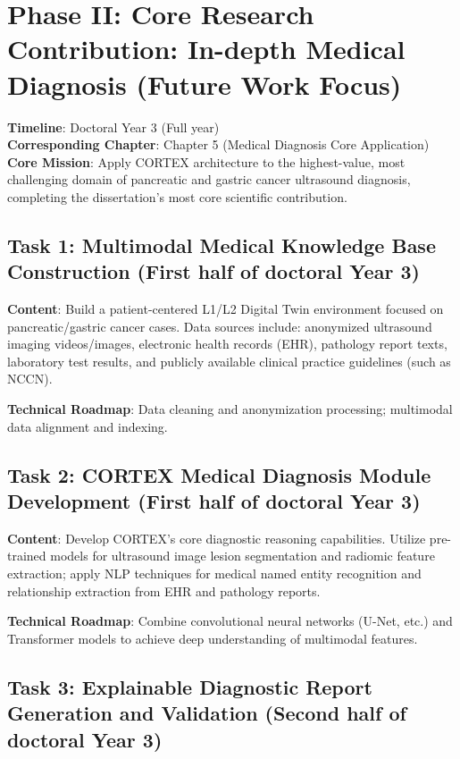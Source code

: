 \section{Phase II: Core Research Contribution: In-depth Medical Diagnosis (Future Work Focus)}

\textbf{Timeline}: Doctoral Year 3 (Full year)\\
\textbf{Corresponding Chapter}: Chapter 5 (Medical Diagnosis Core Application)\\
\textbf{Core Mission}: Apply CORTEX architecture to the highest-value, most challenging domain of pancreatic and gastric cancer ultrasound diagnosis, completing the dissertation's most core scientific contribution.

\subsection{Task 1: Multimodal Medical Knowledge Base Construction (First half of doctoral Year 3)}

\textbf{Content}: Build a patient-centered L1/L2 Digital Twin environment focused on pancreatic/gastric cancer cases. Data sources include: anonymized ultrasound imaging videos/images, electronic health records (EHR), pathology report texts, laboratory test results, and publicly available clinical practice guidelines (such as NCCN).

\textbf{Technical Roadmap}: Data cleaning and anonymization processing; multimodal data alignment and indexing.

\subsection{Task 2: CORTEX Medical Diagnosis Module Development (First half of doctoral Year 3)}

\textbf{Content}: Develop CORTEX's core diagnostic reasoning capabilities. Utilize pre-trained models for ultrasound image lesion segmentation and radiomic feature extraction; apply NLP techniques for medical named entity recognition and relationship extraction from EHR and pathology reports.

\textbf{Technical Roadmap}: Combine convolutional neural networks (U-Net, etc.) and Transformer models to achieve deep understanding of multimodal features.

\subsection{Task 3: Explainable Diagnostic Report Generation and Validation (Second half of doctoral Year 3)}

